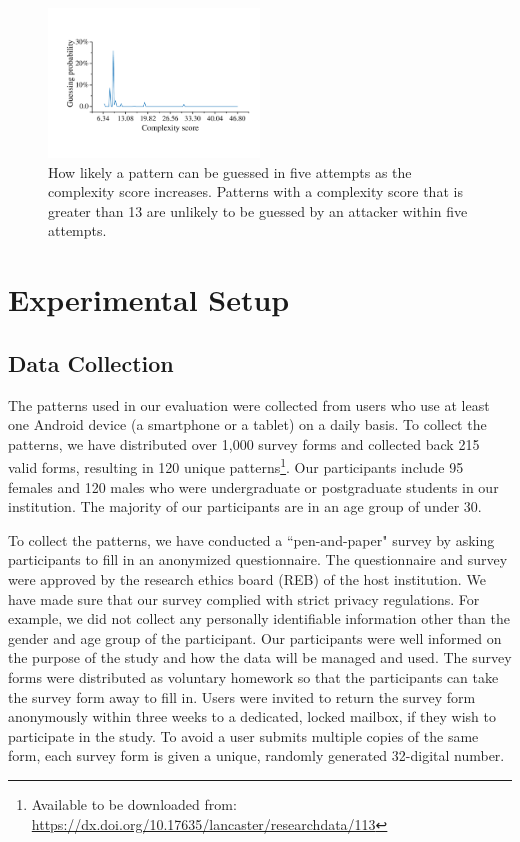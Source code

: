 
        \begin{figure}[!t]
            \centering
            \includegraphics[width=0.5\textwidth]{fig/guess_prob.pdf}
            \caption{How likely a pattern can be guessed in five attempts as the complexity score increases. Patterns with a complexity score that is greater than 13 are
             unlikely to be guessed by an attacker within five attempts.}
            \label{fig:guessing-probability}
        \end{figure}

\section{Experimental Setup \label{sec:setup}}
    \subsection{Data Collection}
    \label{section:locking patterns}
    The patterns used in our evaluation were collected from users who use at least one Android device (a smartphone or a tablet) on a daily basis.
    To collect the patterns, we have distributed over 1,000 survey forms and collected back 215 valid forms, resulting in 120 unique patterns\footnote{Available to be downloaded from: \url{https://dx.doi.org/10.17635/lancaster/researchdata/113}}.
    Our participants include 95 females and 120 males who were undergraduate or postgraduate students in our institution.
    The majority of our participants are in an age group of under 30.

    To collect the patterns, we have conducted a ``pen-and-paper" survey by asking participants to fill in an anonymized questionnaire.
    The questionnaire and survey were approved by the research ethics board (REB) of the host institution.
    We have made sure that our survey complied with strict privacy regulations. For example, we did not collect any personally identifiable information other than the gender and age group of the participant. Our participants were well informed on the purpose
    of the study and how the data will be managed and used. The survey forms were distributed as voluntary homework so that the participants can take the survey form away to fill in.
     Users were invited to return the survey form anonymously within three weeks to a dedicated, locked mailbox, if they wish to participate in the study.
     To avoid a user submits multiple copies of the same form, each survey form is given a unique, randomly generated 32-digital number.


